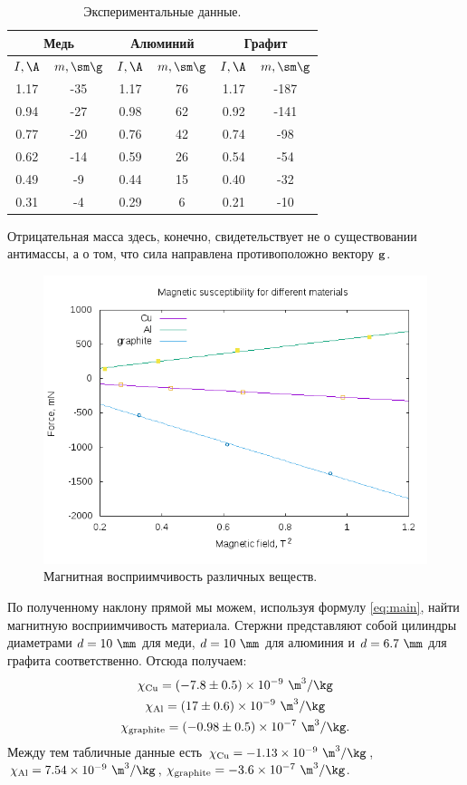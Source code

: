 \documentclass{../lab_class}
\begin{document}
\bigskip

\begin{table}[H]
\centering
\begin{tabular}{|c|c|c|c|c|c|}
\hline
\multicolumn{2}{|c|}{Медь} &\multicolumn{2}{c|}{Алюминий} &\multicolumn{2}{|c|}{Графит}	\\ \hline
$I, \A$ &$m, \sm \g$ &$I, \A$ &$m, \sm \g$ &$I, \A$ &$m, \sm \g$	\\ \hline
1.17 &-35 &1.17 &76 &1.17 &-187	\\ \hline
0.94 &-27 &0.98 &62 &0.92 &-141	\\ \hline
0.77 &-20 &0.76 &42 &0.74 &-98		\\ \hline
0.62 &-14 &0.59 &26 &0.54 &-54		\\ \hline
0.49 &-9  &0.44 &15 &0.40 &-32		\\ \hline
0.31 &-4  &0.29 &6  &0.21 &-10		\\ \hline
\end{tabular}
\caption{Экспериментальные данные.}
\end{table}

Отрицательная масса здесь, конечно, свидетельствует не о существовании антимассы, а о том, что сила направлена противоположно вектору $\vb{g}$.

\begin{figure}[H]
\centering
\includegraphics[width = 0.87 \textwidth]{graph.png}
\caption{Магнитная восприимчивость различных веществ.}
\end{figure}

По полученному наклону прямой мы можем, используя формулу \ref{eq:main}, найти магнитную восприимчивость материала. Стержни представляют собой цилиндры диаметрами $d = 10 \ \mm$ для меди, $d = 10 \ \mm$ для алюминия и $d = 6.7 \ \mm$ для графита соответственно. Отсюда получаем:
\begin{gather*}
	\chi_{\text{Cu}} = (-7.8 \pm 0.5) \times 10^{-9} \ \m^3/\kg \\
	\chi_{\text{Al}} = (17 \pm 0.6) \times 10^{-9} \ \m^3/\kg \\
	\chi_{\text{graphite}} = (-0.98 \pm 0.5) \times 10^{-7} \ \m^3/\kg.
\end{gather*}
Между тем табличные данные есть $\chi_{\text{Cu}} = -1.13 \times 10^{-9} \ \m^3/\kg$, $\chi_{\text{Al}} = 7.54 \times 10^{-9} \ \m^3/\kg$, $\chi_{\text{graphite}} = -3.6 \times 10^{-7} \ \m^3/\kg$.
\end{document}
